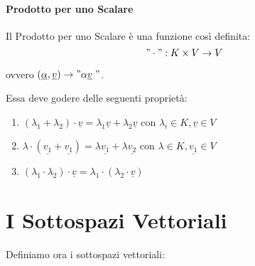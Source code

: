\paragraph{Prodotto per uno Scalare}
Il Prodotto per uno Scalare è una funzione così definita:
\["\cdot" : K \times V \to V \]
\begin{center}
    ovvero $(\underline{\alpha}, \underline{v} ) \to "\alpha\underline{v}\;"$.
\end{center}
Essa deve godere delle seguenti proprietà:
\begin{enumerate}
    \item $(\lambda_1 + \lambda_2) \cdot \underline{v} = \lambda_1\underline{v} + \lambda_2 \underline{v}$ con $\lambda_i \in K, \underline{v} \in V$
    \item $\lambda \cdot (\underline{v_1} + \underline{v_1}) = \lambda\underline{v_1} + \lambda\underline{v_2}$ con $\lambda \in K, \underline{v_1} \in V$
    \item $(\lambda_1 \cdot \lambda_2) \cdot \underline{v} = \lambda_1 \cdot (\lambda_2 \cdot \underline{v})$
\end{enumerate}



\section{I Sottospazi Vettoriali}
Definiamo ora i sottospazi vettoriali:

